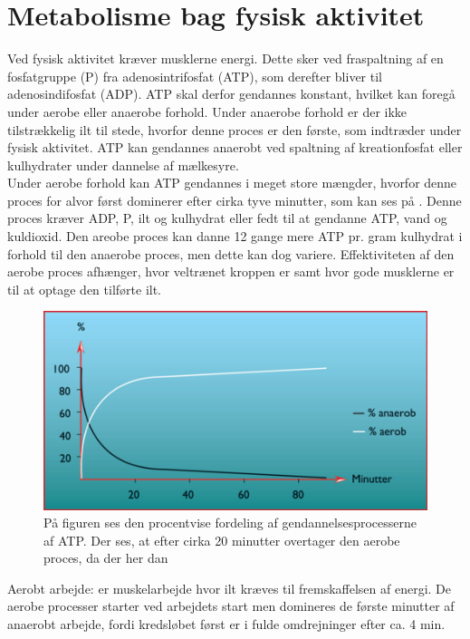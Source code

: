 \section{Metabolisme bag fysisk aktivitet}
Ved fysisk aktivitet kræver musklerne energi. Dette sker ved fraspaltning af en fosfatgruppe (P) fra adenosintrifosfat (ATP), som derefter bliver til adenosindifosfat (ADP). ATP skal derfor gendannes konstant, hvilket kan foregå under aerobe eller anaerobe forhold. Under anaerobe forhold er der ikke tilstrækkelig ilt til stede, hvorfor denne proces er den første, som indtræder under fysisk aktivitet. ATP kan gendannes anaerobt ved spaltning af kreationfosfat eller kulhydrater under dannelse af mælkesyre. \\
Under aerobe forhold kan ATP gendannes i meget store mængder, hvorfor denne proces for alvor først dominerer efter cirka tyve minutter, som kan ses på . Denne proces kræver ADP, P, ilt og kulhydrat eller fedt til at gendanne ATP, vand og kuldioxid. Den areobe proces kan danne 12 gange mere ATP pr. gram kulhydrat i forhold til den anaerobe proces, men dette kan dog variere. Effektiviteten af den aerobe proces afhænger, hvor veltrænet kroppen er samt hvor gode musklerne er til at optage den tilførte ilt. 
\begin{figure}[H]
	\centering
	\includegraphics[scale=0.75]{figures/aProblemanalyse/Metabolisme.png}
	\caption{På figuren ses den procentvise fordeling af gendannelsesprocesserne af ATP. Der ses, at efter cirka 20 minutter overtager den aerobe proces, da der her dan}
	\label{fig:Metabolisme}
\end{figure}


Aerobt arbejde: er muskelarbejde hvor ilt kræves til fremskaffelsen af energi. De aerobe processer starter ved arbejdets start men domineres de første minutter af anaerobt arbejde, fordi kredsløbet først er i fulde omdrejninger efter ca. 4 min.

